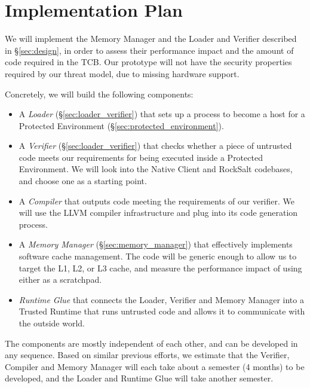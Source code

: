 \section{Implementation Plan}
\label{sec:implementation}

We will implement the Memory Manager and the Loader and Verifier described in
\S \ref{sec:design}, in order to assess their performance impact and the amount
of code required in the TCB. Our prototype will not have the security
properties required by our threat model, due to missing hardware support.

Concretely, we will build the following components:

\begin{itemize}

\item A \textit{Loader} (\S \ref{sec:loader_verifier}) that sets up a process
      to become a host for a Protected Environment
      (\S \ref{sec:protected_environment}).

\item A \textit{Verifier} (\S \ref{sec:loader_verifier}) that checks whether a
      piece of untrusted code meets our requirements for being executed inside
      a Protected Environment. We will look into the Native Client and RockSalt
      codebases, and choose one as a starting point.

\item A \textit{Compiler} that outputs code meeting the requirements of our
      verifier. We will use the LLVM \cite{lattner2004llvm} compiler
      infrastructure and plug into its code generation process.

\item A \textit{Memory Manager} (\S \ref{sec:memory_manager}) that effectively
      implements software cache management. The code will be generic enough to
      allow us to target the L1, L2, or L3 cache, and measure the performance
      impact of using either as a scratchpad.

\item \textit{Runtime Glue} that connects the Loader, Verifier and Memory
      Manager into a Trusted Runtime that runs untrusted code and allows it to
      communicate with the outside world.

\end{itemize}

The components are mostly independent of each other, and can be developed in
any sequence. Based on similar previous efforts, we estimate that the Verifier,
Compiler and Memory Manager will each take about a semester (4 months) to be
developed, and the Loader and Runtime Glue will take another semester.
